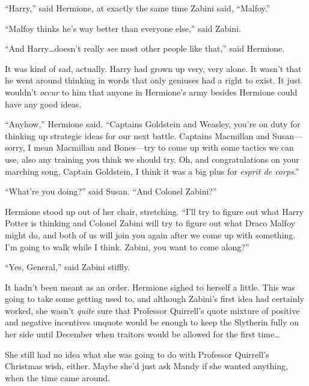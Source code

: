 “Harry,” said Hermione, at exactly the same time Zabini said, “Malfoy.”

“Malfoy thinks he’s way better than everyone else,” said Zabini.

“And Harry…doesn’t really \emph{see} most other people like that,” said Hermione.

It was kind of sad, actually. Harry had grown up very, very alone. It wasn’t that he went around thinking in words that only geniuses had a right to exist. It just wouldn’t \emph{occur} to him that anyone in Hermione’s army besides Hermione could have any good ideas.

“Anyhow,” Hermione said. “Captains Goldstein and Weasley, you’re on duty for thinking up strategic ideas for our next battle. Captains Macmillan and Susan—sorry, I mean Macmillan and Bones—try to come up with some tactics we can use, also any training you think we should try. Oh, and congratulations on your marching song, Captain Goldstein, I think it was a big plus for \emph{esprit de corps}.”

“What’re you doing?” said Susan. “And Colonel Zabini?”

Hermione stood up out of her chair, stretching. “I’ll try to figure out what Harry Potter is thinking and Colonel Zabini will try to figure out what Draco Malfoy might do, and both of us will join you again after we come up with something. I’m going to walk while I think. Zabini, you want to come along?”

“Yes, General,” said Zabini stiffly.

It hadn’t been meant as an order. Hermione sighed to herself a little. This was going to take some getting used to, and although Zabini’s first idea had certainly worked, she wasn’t \emph{quite} sure that Professor Quirrell’s quote mixture of positive and negative incentives unquote would be enough to keep the Slytherin fully on her side until December when traitors would be allowed for the first time…

She still had no idea what she was going to do with Professor Quirrell’s Christmas wish, either. Maybe she’d just ask Mandy if she wanted anything, when the time came around.
